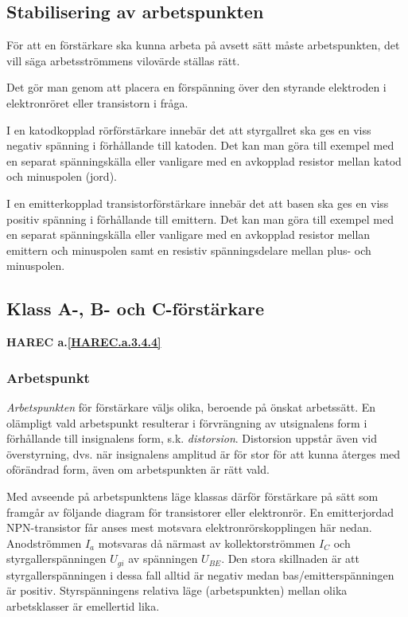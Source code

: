 

\subsection{Stabilisering av arbetspunkten}

För att en förstärkare ska kunna arbeta på avsett sätt måste
arbetspunkten, det vill säga arbetsströmmens vilovärde ställas rätt.

Det gör man genom att placera en förspänning över den styrande
elektroden i elektronröret eller transistorn i fråga.

I en katodkopplad rörförstärkare innebär det att styrgallret ska
ges en viss negativ spänning i förhållande till katoden.
Det kan man göra till exempel med en separat spänningskälla eller vanligare med
en avkopplad resistor mellan katod och minuspolen (jord).

I en emitterkopplad transistorförstärkare innebär det att basen ska
ges en viss positiv spänning i förhållande till emittern.
Det kan man göra till exempel med en separat spänningskälla eller vanligare med
en avkopplad resistor mellan emittern och minuspolen samt en resistiv
spänningsdelare mellan plus- och minuspolen.

\subsection{Klass A-, B- och C-förstärkare}
\textbf{HAREC a.\ref{HAREC.a.3.4.4}\label{myHAREC.a.3.4.4}}

\subsubsection{Arbetspunkt}

\emph{Arbetspunkten} för förstärkare väljs olika, beroende på önskat arbetssätt.
En olämpligt vald arbetspunkt resulterar i förvrängning av utsignalens form i
förhållande till insignalens form, s.k. \emph{distorsion}.
Distorsion uppstår även vid överstyrning, dvs. när insignalens amplitud är
för stor för att kunna återges med oförändrad form, även om arbetspunkten är
rätt vald.

Med avseende på arbetspunktens läge klassas därför förstärkare på sätt
som framgår av följande diagram för transistorer eller elektronrör.
En emitterjordad NPN-transistor får anses mest motsvara
elektronrörskopplingen här nedan.
Anodströmmen \(I_a\) motsvaras då närmast av kollektorströmmen
\(I_C\) och styrgallerspänningen \(U_{gi}\) av spänningen
\(U_{BE}\).
Den stora skillnaden är att styrgallerspänningen i dessa
fall alltid är negativ medan bas/emitterspänningen är positiv.
Styrspänningens relativa läge (arbetspunkten) mellan olika
arbetsklasser är emellertid lika.

